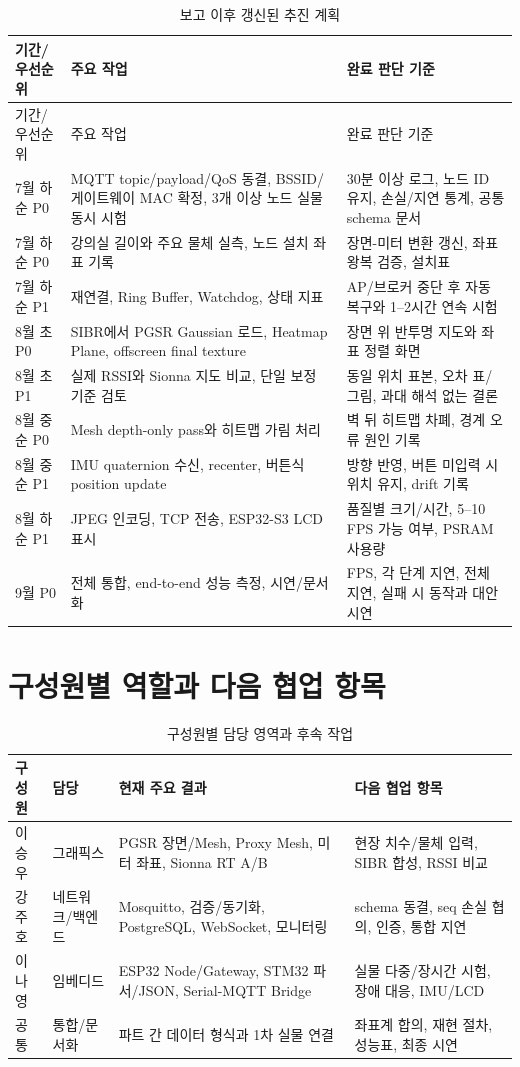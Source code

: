 \documentclass[titlepage]{pnureport}
\begin{document}
\begin{longtable}{C{2.2cm}p{5.5cm}p{4.5cm}}
\caption{보고 이후 갱신된 추진 계획}\label{tab:future-plan}\\
\toprule
기간/우선순위 & 주요 작업 & 완료 판단 기준 \\
\midrule
\endfirsthead
\toprule
기간/우선순위 & 주요 작업 & 완료 판단 기준 \\
\midrule
\endhead
7월 하순 P0 & MQTT topic/payload/QoS 동결, BSSID/게이트웨이 MAC 확정, 3개 이상 노드 실물 동시 시험 & 30분 이상 로그, 노드 ID 유지, 손실/지연 통계, 공통 schema 문서 \\
7월 하순 P0 & 강의실 길이와 주요 물체 실측, 노드 설치 좌표 기록 & 장면-미터 변환 갱신, 좌표 왕복 검증, 설치표 \\
7월 하순 P1 & 재연결, Ring Buffer, Watchdog, 상태 지표 & AP/브로커 중단 후 자동 복구와 1--2시간 연속 시험 \\
8월 초 P0 & SIBR에서 PGSR Gaussian 로드, Heatmap Plane, offscreen final texture & 장면 위 반투명 지도와 좌표 정렬 화면 \\
8월 초 P1 & 실제 RSSI와 Sionna 지도 비교, 단일 보정 기준 검토 & 동일 위치 표본, 오차 표/그림, 과대 해석 없는 결론 \\
8월 중순 P0 & Mesh depth-only pass와 히트맵 가림 처리 & 벽 뒤 히트맵 차폐, 경계 오류 원인 기록 \\
8월 중순 P1 & IMU quaternion 수신, recenter, 버튼식 position update & 방향 반영, 버튼 미입력 시 위치 유지, drift 기록 \\
8월 하순 P1 & JPEG 인코딩, TCP 전송, ESP32-S3 LCD 표시 & 품질별 크기/시간, 5--10 FPS 가능 여부, PSRAM 사용량 \\
9월 P0 & 전체 통합, end-to-end 성능 측정, 시연/문서화 & FPS, 각 단계 지연, 전체 지연, 실패 시 동작과 대안 시연 \\
\bottomrule
\end{longtable}

\section{구성원별 역할과 다음 협업 항목}

\begin{table}[H]
\centering
\caption{구성원별 담당 영역과 후속 작업}
\label{tab:roles}
\begin{tabularx}{\textwidth}{C{2.3cm}C{2.5cm}YY}
\toprule
구성원 & 담당 & 현재 주요 결과 & 다음 협업 항목 \\
\midrule
이승우 & 그래픽스 & PGSR 장면/Mesh, Proxy Mesh, 미터 좌표, Sionna RT A/B & 현장 치수/물체 입력, SIBR 합성, RSSI 비교 \\
강주호 & 네트워크/백엔드 & Mosquitto, 검증/동기화, PostgreSQL, WebSocket, 모니터링 & schema 동결, seq 손실 협의, 인증, 통합 지연 \\
이나영 & 임베디드 & ESP32 Node/Gateway, STM32 파서/JSON, Serial-MQTT Bridge & 실물 다중/장시간 시험, 장애 대응, IMU/LCD \\
공통 & 통합/문서화 & 파트 간 데이터 형식과 1차 실물 연결 & 좌표계 합의, 재현 절차, 성능표, 최종 시연 \\
\bottomrule
\end{tabularx}
\end{table}
\end{document}
